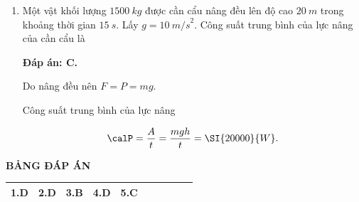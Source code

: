 \begin{enumerate}[label=\bfseries Câu \arabic*:]
	
	{Phát biểu nào sau đây là đúng?
	}
	
	\hideall
	{	
		\textbf{Đáp án: D.}
		
		Công suất là đại lượng đo bằng công sinh ra trong một đơn vị thời gian. Do đó máy có công suất lớn thì thời gian sinh công sẽ nhanh.
	}
	\item {}
	
	
	{Một vật khối lượng $\SI{1500}{kg}$ được cần cẩu nâng đều lên độ cao $\SI{20}{m}$ trong khoảng thời gian $\SI{15}{s}$. Lấy $g = \SI{10}{m/s}^2$. Công suất trung bình của lực nâng của cần cẩu là
	}
	
	\hideall
	{	\textbf{Đáp án: C.}
		
		Do nâng đều nên $F = P = mg$.
		
		Công suất trung bình của lực nâng
		
		$$\calP = \dfrac{A}{t} = \dfrac{mgh}{t} = \SI{20000}{W}.$$
	}
\end{enumerate}
\hideall
{
	\begin{center}
		\textbf{BẢNG ĐÁP ÁN}
	\end{center}
	\begin{center}
		\begin{tabular}{|m{2.8em}|m{2.8em}|m{2.8em}|m{2.8em}|m{2.8em}|m{2.8em}|m{2.8em}|m{2.8em}|m{2.8em}|m{2.8em}|}
			\hline
			1.D  & 2.D  & 3.B  & 4.D & 5.C  &   &   &   &   &   \\
			\hline
		\end{tabular}
	\end{center}
}
